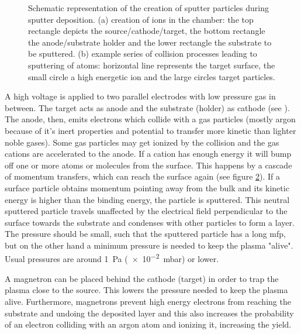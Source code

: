 \begin{figure}[htb]
\begin{subfigure}[t]{.3\textwidth}
        \caption{}
        \label{fig:sputter1}
    \end{subfigure}
    \caption{Schematic representation of the creation of sputter particles during sputter deposition. 
    (a) creation of ions in the chamber: 
        the top rectangle depicts the source/cathode/target, 
        the bottom rectangle the anode/substrate holder and 
        the lower rectangle the substrate to be sputtered. 
    (b) example series of collision processes leading to sputtering of atoms: 
        horizontal line represents the target surface, 
        the small circle a high energetic ion and 
        the large circles target particles. 
    }
	\label{fig:sputter}
\end{figure}

A high voltage is applied to 
two parallel electrodes with low pressure gas in between. 
The target acts as anode and the substrate (holder) as cathode (see ).
The anode, then, emits electrons which collide with a gas particles (mostly argon because of it's inert properties and potential to transfer more kinetic than lighter noble gases). 
Some gas particles may get ionized by the collision and the gas cations are accelerated to the anode. 
If a cation has enough energy it will bump off one or more atoms or molecules from the surface. 
This happens by a cascade of momentum transfers, which can reach the surface again (see figure \ref{fig:sputter}). 
If a surface particle obtains momentum pointing away from the bulk and its kinetic energy is higher than the binding energy, the particle is sputtered. 
This neutral sputtered particle travels unaffected by the electrical field perpendicular to the surface towards the substrate and condenses with other particles to form a layer.
The pressure should be small, such that the sputtered particle has a long \gls{mfp}, but on the other hand 
a minimum pressure is needed to keep the plasma "alive". 
Usual pressures are around \SI{1}{\Pa} (\num{e-2}\SI{}{\milli\bar}) or lower\cite{Swann1988}.

A magnetron can be placed behind the cathode (target) in order to trap the plasma close to the source. 
This lowers the pressure needed to keep the plasma alive. 
Furthermore, magnetrons prevent high energy electrons from reaching the substrate and 
undoing the deposited layer and this also increases the probability of an electron 
colliding with an argon atom and ionizing it, increasing the yield.

